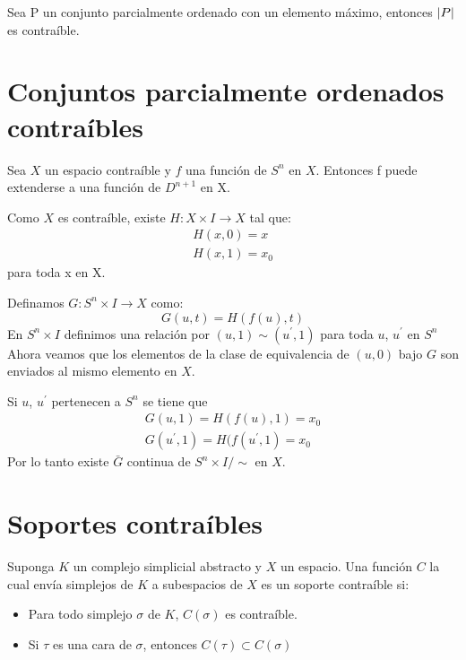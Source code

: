 \begin{Col}
Sea P un conjunto parcialmente ordenado con un elemento máximo, entonces $\left| P \right|$ es contraíble.
\end{Col}
\section{Conjuntos parcialmente ordenados contraíbles}
\begin{Teo}
Sea $X$ un espacio contraíble y $f$ una función de $S^n$ en $X$. Entonces f puede extenderse a una función de $D^{n+1}$ en X.
\end{Teo}
 
\begin{Dem}
Como $X$ es contraíble, existe $H\colon X\times I \rightarrow X$ tal que:
\begin{eqnarray}
H(x,0)=x \\
H(x,1) = x_0
\end{eqnarray}
para toda x en X.

Definamos $G\colon S^n\times I \rightarrow X$ como:
\begin{equation}
G(u,t) = H(f(u),t)
\end{equation}
En $S^n\times I$ definimos una relación por $(u,1)\sim(u^{'},1)$ para toda $u$, $u^{'}$ en $S^n$
Ahora veamos que los elementos de la clase de equivalencia de $(u,0)$ bajo $G$ son enviados al mismo elemento en $X$.

Si $u$, $u^{'}$ pertenecen a $S^n$ se tiene que
\begin{eqnarray}
G(u,1) = H(f(u),1) = x_0\\
G(u^{'},1)=H(f(u^{'},1) = x_0
\end{eqnarray}
Por lo tanto existe $\bar{G}$ continua de $S^n\times I /{\sim}$ en $X$.
\end{Dem}

\section{Soportes contraíbles}
\begin{Defi}
Suponga $K$ un complejo simplicial abstracto y $X$ un espacio. Una función $C$ la cual envía simplejos de $K$ a subespacios de $X$ es un soporte contraíble si:
\begin{itemize}
\item Para todo simplejo $\sigma$ de $K$, $C(\sigma)$ es contraíble.
\item Si $\tau$ es una cara de $\sigma$, entonces $C(\tau)\subset C(\sigma)$
\end{itemize}
\end{Defi}

